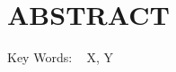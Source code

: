 \newpage
\section*{\centering{}\xiaosan\hspace{-1cm} ABSTRACT}

{\leading{21pt}

\noindent

}

{
\noindent
Key Words:}
{~\hspace{-1cm}
X, Y}

